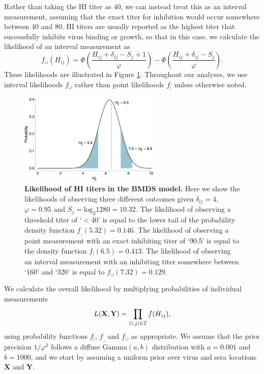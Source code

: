 \documentclass[11pt,oneside,letterpaper]{article}
\newcommand{\point}{f_{\scriptscriptstyle \vert}}	%
\newcommand{\threshold}{f_{\textstyle \lrcorner}}	%
\newcommand{\interval}{f_{\sqcup}}					%
\newcommand{\mdssd}{\varphi}						%
\begin{document}
Rather than taking the HI titer as 40, we can instead treat this as an interval measurement, assuming that the exact titer for inhibition would occur somewhere between 40 and 80.
HI titers are usually reported as the highest titer that successfully inhibits virus binding or growth, so that in this case, we calculate the likelihood of an interval measurement as
\begin{equation} 
	\interval(H_{ij}) = \Phi \left( \frac{ H_{ij} + \delta_{ij} - S_j + 1 }{ \mdssd } \right) - \Phi \left( \frac{ H_{ij} + \delta_{ij} - S_j }{\mdssd} \right).
\end{equation}
These likelihoods are illustrated in Figure \ref{hij_likelihood}.
Throughout our analyses, we use interval likelihoods $\interval$ rather than point likelihoods $\point$ unless otherwise noted.

\begin{figure}[tb]
	\centering		
	\includegraphics[width=0.6\textwidth]{figures/hij_likelihood}
	\caption{\textbf{Likelihood of HI titers in the BMDS model.} 
	Here we show the likelihoods of observing three different outcomes given $\delta_{ij} = 4$, $\mdssd = 0.95$ and $S_j = \mathrm{log}_2 1280 = 10.32$.  
	The likelihood of observing a threshold titer of `$<$40' is equal to the lower tail of the probability density function $\threshold(5.32) = 0.146$.
	The likelihood of observing a point measurement with an exact inhibiting titer of `90.5' is equal to the density function $\point(6.5) = 0.413$.
	The likelihood of observing an interval measurement with an inhibiting titer somewhere between `160' and `320' is equal to $\interval(7.32) = 0.129.$
	} 
	\label{hij_likelihood} 
\end{figure}

We calculate the overall likelihood by multiplying probabilities of individual measurements
\begin{equation} 
	L(\mathbf{X},\mathbf{Y}) = \prod_{(i,j) \in \cal I} f(H_{ij}),
\end{equation}
using probability functions $\point$, $\threshold$ and $\interval$ as appropriate.
We assume that the prior precision $1/\mdssd^2$ follows a diffuse $\mbox{Gamma}(a, b)$ distribution with $a=0.001$ and $b=1000$, and we start by assuming a uniform prior over virus and sera locations $\mathbf{X}$ and $\mathbf{Y}$.
\end{document}
